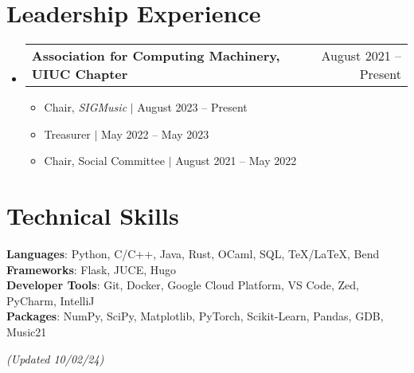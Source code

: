 \documentclass[letterpaper,11pt]{article}
\makeatletter
\newcommand{\resumeItem}[1]{
  \item\small{
    {#1 \vspace{-2pt}}
  }
}
\newcommand{\resumeProjectHeading}[2]{
    \item
    \begin{tabular*}{0.97\textwidth}{l@{\extracolsep{\fill}}r}
      \small#1 & #2 \\
    \end{tabular*}\vspace{-7pt}
}
\newcommand{\resumeSubHeadingListStart}{\begin{itemize}[leftmargin=0.15in, label={}]}
\newcommand{\resumeSubHeadingListEnd}{\end{itemize}}
\newcommand{\resumeItemListStart}{\begin{itemize}}
\newcommand{\resumeItemListEnd}{\end{itemize}\vspace{-5pt}}
\makeatother
\begin{document}
\section{Leadership Experience}
    \resumeSubHeadingListStart
    \resumeProjectHeading
          {\textbf{Association for Computing Machinery, UIUC Chapter}}{August 2021 -- Present}
          \resumeItemListStart
            \resumeItem{Chair, \textit{SIGMusic} $|$ August 2023 -- Present}
            \resumeItem{Treasurer $|$ May 2022 -- May 2023}
            \resumeItem{Chair, Social Committee $|$ August 2021 -- May 2022}
          \resumeItemListEnd
    \resumeSubHeadingListEnd

%
\section{Technical Skills}
 \begin{itemize}[leftmargin=0.15in, label={}]
    \small{\item{
     \textbf{Languages}{: Python, C/C++, Java, Rust, OCaml, SQL, TeX/LaTeX, Bend} \\
     \textbf{Frameworks}{: Flask, JUCE, Hugo} \\
     \textbf{Developer Tools}{: Git, Docker, Google Cloud Platform, VS Code, Zed, PyCharm, IntelliJ} \\
     \textbf{Packages}{: NumPy, SciPy, Matplotlib, PyTorch, Scikit-Learn, Pandas, GDB, Music21}
    }}
 \end{itemize}

\textit{(Updated 10/02/24)}

\end{document}
